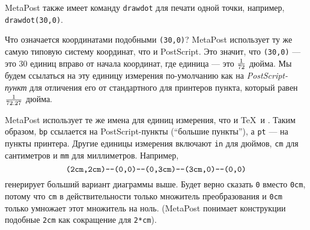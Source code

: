 \documentclass{article} %
\def\ttt{\texttt}  %
\begin{document}
\label{Ddrawdot}MetaPost также имеет команду \ttt{drawdot} для печати 
одной точки, например, \ttt{drawdot(30,0)}. 

Что означается координатами подобными \verb|(30,0)|? 
MetaPost использует ту же самую типовую систему координат, что и 
PostScript.
Это значит, что \verb|(30,0)| --- это 30 единиц вправо от начала 
координат, где единица --- это $1\over72$ дюйма.
Мы будем ссылаться на эту единицу измерения по-умолчанию как на 
{\sl PostScript-пункт} 
для отличения его от стандартного для принтеров 
пункта, который равен $1\over72.27$ дюйма.

MetaPost использует те же имена для единиц измерения, что и \TeX\ и \MF.
Таким образом, \verb|bp|\label{Dbp} ссылается на PostScript-пункты (``большие пункты''), а  \verb|pt|\label{Dpt} --- на пункты принтера.
Другие единицы измерения включают
\verb|in|\label{Din} для дюймов,
\verb|cm|\label{Dcm} для сантиметров и  \verb|mm|\label{Dmm} для миллиметров. 
Например,
$$ \hbox{\verb|(2cm,2cm)--(0,0)--(0,3cm)--(3cm,0)--(0,0)|} $$
генерирует больший вариант диаграммы выше.
Будет верно сказать \verb|0| вместо \verb|0cm|, потому что {\tt cm} 
в действительности только множитель преобразования и {\tt 0cm} только 
умножает этот множитель на ноль.
(MetaPost понимает конструкции подобные 
{\tt 2cm} как сокращение для \verb|2*cm|).
\end{document}
